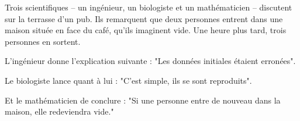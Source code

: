 
Trois scientifiques --  un ingénieur, un biologiste et un mathématicien --  discutent sur la terrasse d'un pub. Ils remarquent que deux personnes entrent dans une maison située en face du café, qu'ils imaginent vide. Une heure plus tard, trois personnes en sortent. 

L'ingénieur donne l'explication suivante : "Les données initiales étaient erronées".

Le biologiste lance quant à lui : "C'est simple, ils se sont reproduits".

Et le mathématicien de conclure : "Si une personne entre de nouveau dans la maison, elle redeviendra vide."